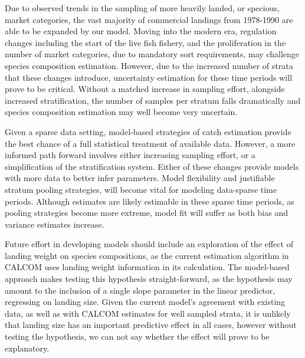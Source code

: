 \documentclass[12pt]{article}
\begin{document}

Due to observed trends in the sampling of more heavily landed, or
specious, market categories, the vast majority of commercial landings
from 1978-1990 are able to be expanded by our model. Moving into the
modern era, regulation changes including the start of the live fish
fishery, and the proliferation in the number of market categories, due
to mandatory sort requirements, may challenge species composition
estimation. However, due to the increased number of strata that these
changes introduce, uncertainty estimation for these time periods will
prove to be critical. Without a matched increase in sampling effort,
alongside increased stratification, the number of samples per stratum
falls dramatically and species composition estimation may well become
very uncertain.

Given a sparse data setting, model-based strategies of catch estimation
provide the best chance of a full statistical treatment of available
data. However, a more informed path forward involves either increasing
sampling effort, or a simplification of the stratification system.
Either of these changes provide models with more data to better infer
parameters. Model flexibility and justifiable stratum pooling
strategies, will become vital for modeling data-sparse time periods.
Although estimates are likely estimable in these sparse time periods, as
pooling strategies become more extreme, model fit will suffer as both
bias and variance estimates increase.


Future effort in developing models should include an exploration of the
effect of landing weight on species compositions, as the current estimation
algorithm in CALCOM uses landing weight information in its calculation. The 
model-based approach makes testing this hypothesis straight-forward, as the 
hypothesis may amount to the inclusion of a single slope parameter in the 
linear predictor, regressing on landing size. Given the current model's 
agreement with existing data, as well as with CALCOM estimates for well sampled 
strata, it is unlikely that landing size has an important predictive effect in 
all cases, however without testing the hypothesis, we can not say whether the 
effect will prove to be explanatory.
\end{document}
